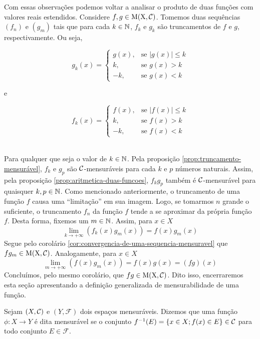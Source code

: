 Com essas observações podemos voltar a analisar o produto de duas funções com valores reais estendidos.
Considere $f,g \in \operatorname{M(X, \mathcal{C} )}$. 
Tomemos duas sequências $(f_n)$ e $(g_m)$ tais que para cada $k \in \operatorname{\mathbb{N}}$, $f_k$ e $g_k$ são truncamentos de $f$ e $g$, respectivamente.
Ou seja, 
	\begin{minipage}{0.5\linewidth}
	$$ g_k(x) =
	\left\{\begin{array}{cc}
		g(x), & \textrm{se\ } |g(x)| \leq k \\
		k, & \textrm{se\ } g(x) > k \\
		-k, & \textrm{se\ } g(x) < k 
	\end{array}\right.	
	$$	
	\end{minipage}
e
	\begin{minipage}{0.5\linewidth}
		$$ f_k(x) =
		\left\{\begin{array}{cc}
			f(x), & \textrm{se\ } |f(x)| \leq k \\
			k, & \textrm{se\ } f(x) > k \\
			-k, & \textrm{se\ } f(x) < k 
		\end{array}\right.	
		$$	
	\end{minipage}
\\

Para qualquer que seja o valor de $k \in \operatorname{\mathbb{N}}$.
Pela proposição \ref{prop:truncamento-mensurável}, $f_k$ e $g_p$ são $\operatorname{\mathcal{C}}$-mensuráveis para cada $k$ e $p$ números naturais.
Assim, pela proposição \ref{prop:aritmetica-duas-funcoes}, $f_kg_p$ também é $\operatorname{\mathcal{C}}$-mensurável para quaisquer $k, p \in \operatorname{\mathbb{N}}$.
Como mencionado anteriormente, o truncamento de uma função $f$ causa uma \enquote{limitação} em sua imagem.
Logo, se tomarmos $n$ grande o suficiente, o truncamento $f_n$ da função $f$ tende a se aproximar da própria função $f$.
Desta forma, fixemos um $m \in \operatorname{\mathbb{N}}$.
Assim, para $x \in X$
$$
\lim_{k \to +\infty} \left(f_k(x)g_m(x)\right) = f(x)g_m(x) 
$$
Segue pelo corolário \ref{cor:convergencia-de-uma-sequencia-mensuravel} que 
$fg_m \in \operatorname{M(X, \mathcal{C} )}$. 
Analogamente, para $x \in X$
$$
\lim_{m \to +\infty} \left(f(x)g_m(x)\right) 
= f(x)g(x) = (fg)(x)
$$
Concluímos, pelo mesmo corolário, que $fg \in \operatorname{M(X, \mathcal{C} )}$.
Dito isso, encerraremos esta seção apresentando a definição generalizada de mensurabilidade de uma função.

\begin{definition}
	\label{def:mensurabilidade-geral}
	Sejam $(X, \operatorname{\mathcal{C}})$ e $(Y,\mathcal{F})$ dois espaços mensuráveis.
	Dizemos que uma função $\phi:X \to Y$ é dita mensurável se o conjunto $f^{-1}(E) = \{x \in X; f(x)\in E\} \in \operatorname{\mathcal{C}}$ para todo conjunto $E \in \mathcal{F}$. 
\end{definition}


